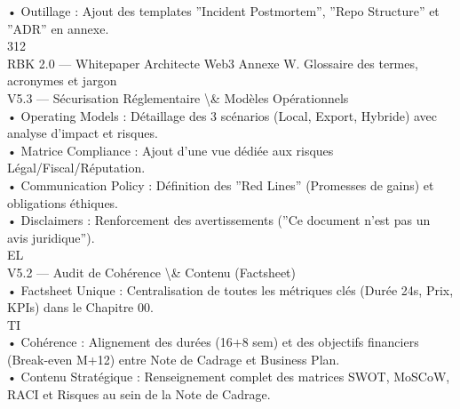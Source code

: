 \documentclass[12pt,landscape,a4paper]{article}
\begin{document}
• Outillage : Ajout des templates ”Incident Postmortem”, ”Repo Structure” et ”ADR” en annexe.\\
\vspace{0.5em}
\vspace{0.5em}
\vspace{0.5em}
\vspace{0.5em}
312\\
RBK 2.0 — Whitepaper Architecte Web3                                                                    Annexe W. Glossaire des termes, acronymes et jargon\\
\vspace{0.5em}
\vspace{0.5em}
\vspace{0.5em}
V5.3 — Sécurisation Réglementaire \textbackslash{}& Modèles Opérationnels\\
• Operating Models : Détaillage des 3 scénarios (Local, Export, Hybride) avec analyse d’impact et risques.\\
• Matrice Compliance : Ajout d’une vue dédiée aux risques Légal/Fiscal/Réputation.\\
• Communication Policy : Définition des ”Red Lines” (Promesses de gains) et obligations éthiques.\\
• Disclaimers : Renforcement des avertissements (”Ce document n’est pas un avis juridique”).\\
\vspace{0.5em}
\vspace{0.5em}
\vspace{0.5em}
\vspace{0.5em}
EL\\
V5.2 — Audit de Cohérence \textbackslash{}& Contenu (Factsheet)\\
• Factsheet Unique : Centralisation de toutes les métriques clés (Durée 24s, Prix, KPIs) dans le Chapitre 00.\\
\vspace{0.5em}
\vspace{0.5em}
\vspace{0.5em}
\vspace{0.5em}
TI\\
• Cohérence : Alignement des durées (16+8 sem) et des objectifs financiers (Break-even M+12) entre Note de Cadrage et Business Plan.\\
• Contenu Stratégique : Renseignement complet des matrices SWOT, MoSCoW, RACI et Risques au sein de la Note de Cadrage.\\
\vspace{0.5em}
\end{document}
